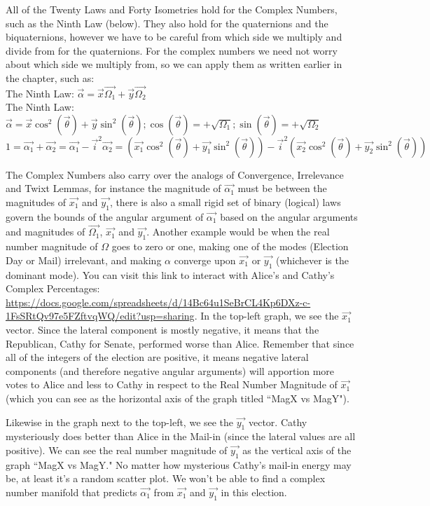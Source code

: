 All of the Twenty Laws and Forty Isometries hold for the Complex Numbers, such as the Ninth Law (below). They also hold for the quaternions and the biquaternions, however we have to be careful from which side we multiply and divide from for the quaternions. For the complex numbers we need not worry about which side we multiply from, so we can apply them as written earlier in the chapter, such as:\\
The Ninth Law: $\vec{\alpha}=\vec{x}\vec{\Omega_{1}}+\vec{y}\vec{\Omega_{2}}$\\
The Ninth Law: $\vec{\alpha}=\vec{x}\cos^{2}( \vec\theta )+\vec{y}\sin^{2}( \vec\theta ); \cos(\vec{\theta})=+\sqrt{\Omega_{1}}; \sin(\vec{\theta})=+\sqrt{\Omega_{2}}$
$$1=\vec{\alpha_{1}}+\vec{\alpha_{2}}=\vec{\alpha_{1}}-\vec{i}^2\vec{\alpha_{2}}=\left(\vec{x_{1}}\cos^{2}( \vec\theta )+\vec{y_{1}}\sin^{2}( \vec\theta )\right)-\vec{i}^2\left(\vec{x_{2}}\cos^{2}( \vec\theta )+\vec{y_{2}}\sin^{2}( \vec\theta )\right)$$

The Complex Numbers also carry over the analogs of Convergence, Irrelevance and Twixt Lemmas, for instance the magnitude of $\vec{\alpha_{1}}$ must be between the magnitudes of $\vec{x_{1}}$ and $\vec{y_{1}}$, there is also a small rigid set of binary (logical) laws govern the bounds of the angular argument of $\vec{\alpha_{1}}$ based on the angular arguments and magnitudes of $\vec{\Omega_{1}}$, $\vec{x_{1}}$ and $\vec{y_{1}}$. Another example would be when the real number magnitude of $\Omega$ goes to zero or one, making one of the modes (Election Day or Mail) irrelevant, and making $\alpha$ converge upon $\vec{x_{1}}$ or $\vec{y_{1}}$ (whichever is the dominant mode).
\newpage
You can visit this link to interact with Alice's and Cathy's Complex Percentages: \url{https://docs.google.com/spreadsheets/d/14Bc64u1SeBrCL4Kp6DXz-c-1FsSRtQv97e5FZftvqWQ/edit?usp=sharing}. In the top-left graph, we see the $\vec{x_{1}}$ vector. Since the lateral component is mostly negative, it means that the Republican, Cathy for Senate, performed worse than Alice. Remember that since all of the integers of the election are positive, it means negative lateral components (and therefore negative angular arguments) will apportion more votes to Alice and less to Cathy in respect to the Real Number Magnitude of $\vec{x_{1}}$ (which you can see as the horizontal axis of the graph titled ``MagX vs MagY").

Likewise in the graph next to the top-left, we see the $\vec{y_{1}}$ vector. Cathy mysteriously does better than Alice in the Mail-in (since the lateral values are all positive). We can see the real number magnitude of $\vec{y_{1}}$ as the vertical axis of the graph ``MagX vs MagY." No matter how mysterious Cathy's mail-in energy may be, at least it's a random scatter plot. We won't be able to find a complex number manifold that predicts $\vec{\alpha_{1}}$ from $\vec{x_{1}}$ and $\vec{y_{1}}$ in this election.

